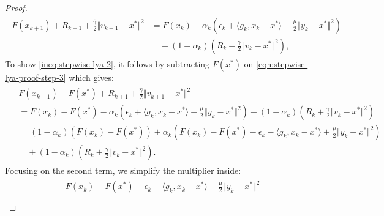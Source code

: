 \documentclass[12pt]{article}
\begin{document}
\begin{proof}
\begin{align}
            \begin{split}
                F(x_{k + 1}) + R_{k + 1} + 
                \frac{\hat \gamma}{2}\Vert v_{k + 1} - x^*\Vert^2
                &= 
                F(x_k) - \alpha_k\left(
                    \epsilon_k + \langle g_k, x_k - x^*\rangle
                    - \frac{\mu}{2}\Vert y_k - x^*\Vert^2
                \right)
                \\
                & \quad 
                + 
                (1 - \alpha_k)\left(
                    R_k + \frac{\gamma}{2}\Vert v_k - x^*\Vert^2
                \right), 
            \end{split}
        \end{align}
        To show \eqref{ineq:stepwise-lya-2}, it follows by subtracting $F(x^*)$ on \eqref{eqn:stepwise-lya-proof-step-3} which gives: 
        \begin{align}
            \begin{split}\label{eqn:stepwise-lya-proof-eqn3.2}
                & F(x_{k + 1}) - F(x^*) + R_{k + 1} + 
                \frac{\hat \gamma}{2}\Vert v_{k + 1} - x^*\Vert^2
                \\
                &= 
                F(x_k) - F(x^*) - \alpha_k\left(
                    \epsilon_k + \langle g_k, x_k - x^*\rangle
                    - \frac{\mu}{2}\Vert y_k - x^*\Vert^2
                \right)
                + 
                (1 - \alpha_k)\left(
                    R_k + \frac{\gamma}{2}\Vert v_k - x^*\Vert^2
                \right)
                \\
                &= (1 - \alpha_k)(F(x_k) - F(x^*))
                + \alpha_k\left(
                    F(x_k) - F(x^*) - \epsilon_k - \langle g_k, x_k - x^*\rangle + \frac{\mu}{2}\Vert y_k - x^*\Vert^2
                \right)
                \\ &\quad 
                    + 
                    (1 - \alpha_k)\left(
                        R_k + \frac{\gamma}{2}\Vert v_k - x^*\Vert^2
                    \right).
            \end{split}
        \end{align}
        Focusing on the second term, we simplify the multiplier inside: 
        {\small
        \begin{align}
        \begin{split}\label{ineq:stepwise-lya-proof-ineq4}
            & F(x_k) - F(x^*) - \epsilon_k - \langle g_k, x_k - x^*\rangle + \frac{\mu}{2}\Vert y_k - x^*\Vert^2
            \\

\end{split}
\end{align}}
\end{proof}
\end{document}
